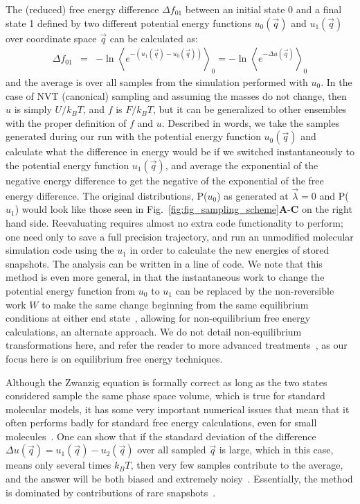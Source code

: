 \documentclass[9pt,bestpractices,pubversion]{livecoms}
\newcommand{\expect}[1]{\left\langle{#1}\right\rangle}
\begin{document}
The (reduced) free energy difference $\Delta f_{01}$ between an initial state 0 and a final state 1 defined by two different potential energy functions 
$u_0(\vec{q})$ and $u_1(\vec{q})$ over coordinate space $\vec{q}$ can be calculated as:
\begin{eqnarray}
\Delta f_{01} & = & -\ln \expect{e^{-(u_1(\vec{q}) - u_0(\vec{q}))}}_0 =  -\ln \expect{e^{-\Delta u(\vec{q})} }_0
\end{eqnarray}\label{eqn.zwanzig}
and the average is over all samples from the simulation performed with $u_0$. In the case of NVT (canonical) sampling and assuming the masses do not change, then $u$ is simply $U/k_BT$, and $f$ is $F/k_BT$, but it can be generalized to other ensembles with the proper definition of $f$ and $u$.
Described in words, we take the samples generated during our run with the potential energy function $u_0(\vec{q})$ and calculate what the difference in energy would be if we switched instantaneously to the potential energy function $u_1(\vec{q})$, and average the exponential of the negative energy difference to get the negative of the exponential of the free energy difference. The original distributions, P($u_0$) as generated at $\vec{\lambda}=0$ and P($u_1$) would look like those seen in Fig.~\ref{fig:fig_sampling_scheme}\textbf{A}-\textbf{C} on the right hand side. Reevaluating requires almost no extra code functionality to perform; one need only to save a full precision trajectory, and run an unmodified molecular simulation code using the $u_1$ in order to calculate the new energies of stored snapshots. The analysis can be written in a line of code. We note that this method is even more general, in that the instantaneous work to change the potential energy function from $u_0$ to $u_1$ can be replaced by the non-reversible work $W$ to make the same change beginning from the same equilibrium conditions at either end state~\cite{jarzynski1997nonequilibrium,jarzynski1998equilibrium,crooks2000pathensemble}, allowing for non-equilibrium free energy calculations, an alternate approach. We do not detail non-equilibrium transformations here, and refer the reader to more advanced treatments~\cite{maragakis2008bayesian,oberhofer2005biased,procacci2015unbiased,shirts2003equilibrium,ytreberg2004singleensemble, gapsys2020large}, as our focus here is on equilibrium free energy techniques.

Although the Zwanzig equation is formally correct as long as the two states considered sample the same phase space volume, which is true for standard molecular models, it has some very important numerical issues that mean that it often performs badly for standard free energy calculations, even for small molecules~\cite{shirts2005comparison,lu2003appropriate}. One can show that if the standard deviation of the difference $\Delta u(\vec{q}) = u_1(\vec{q})-u_2(\vec{q})$ over all sampled $\vec{q}$ is large, which in this case, means only several times $k_BT$, then very few samples contribute to the average, and the answer will be both biased and extremely noisy~\cite{lelievre2010free}. Essentially, the method is dominated by contributions of rare snapshots~\cite{jarzynski2006rare, wu2005phasespace, wu2005phasespacea}. 
\end{document}

